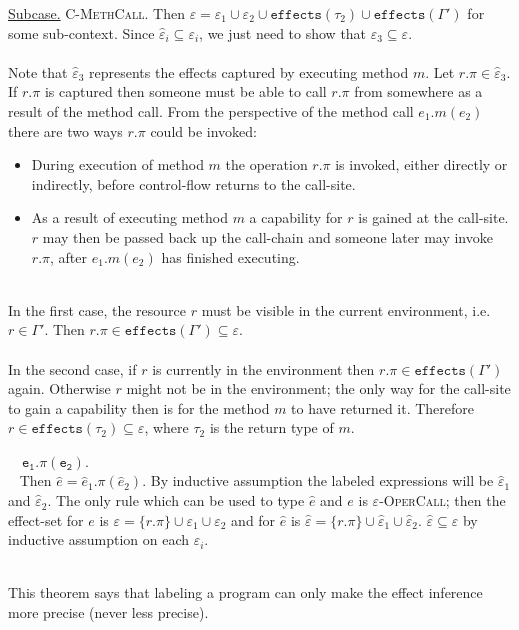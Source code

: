 \documentclass{llncs}
\newcommand{\keywadj}[1]{\mathtt{#1}}
\newcommand{\proofcase}[2]{
	\begin{adjustwidth}{1.5em}{0pt}
		\fbox{Case.}~~#1. \\ ~#2
	\end{adjustwidth}
}
\newcommand{\subcase}[1] {
	\begin{adjustwidth}{2.2em}{0pt}
		\underline{Subcase.} #1
	\end{adjustwidth}
}
\begin{document}
{{	\subcase{\textsc{C-MethCall}. Then $\varepsilon = \varepsilon_1 \cup \varepsilon_2 \cup \keywadj{effects}(\tau_2) \cup \keywadj{effects}(\Gamma')$ for some sub-context. Since $\hat \varepsilon_i \subseteq \varepsilon_i$, we just need to show that $\hat \varepsilon_3 \subseteq \varepsilon$. \\\\ Note that $\hat \varepsilon_3$ represents the effects captured by executing method $m$. Let $r.\pi \in \hat \varepsilon_3$. If $r.\pi$ is captured then someone must be able to call $r.\pi$ from somewhere as a result of the method call. From the perspective of the method call $e_1.m(e_2)$ there are two ways $r.\pi$ could be invoked:
\begin{itemize}
	\item During execution of method $m$ the operation $r.\pi$ is invoked, either directly or indirectly, before control-flow returns to the call-site.
	\item As a result of executing method $m$ a capability for $r$ is gained at the call-site. $r$ may then be passed back up the call-chain and someone later may invoke $r.\pi$, after $e_1.m(e_2)$ has finished executing.
\end{itemize}	
	
~\\In the first case, the resource $r$ must be visible in the current environment, i.e. $r \in \Gamma'$. Then $r.\pi \in \keywadj{effects}(\Gamma') \subseteq \varepsilon$.
	\\\\
	In the second case, if $r$ is currently in the environment then $r.\pi \in \keywadj{effects}(\Gamma')$ again. Otherwise $r$ might not be in the environment; the only way for the call-site to gain a capability then is for the method $m$ to have returned it. Therefore $r \in \keywadj{effects}(\tau_2) \subseteq \varepsilon$, where $\tau_2$ is the return type of $m$.
}
\proofcase{$\keywadj{e_1.\pi(e_2)}$}{
	Then $\hat e = \hat e_1.\pi(\hat e_2)$. By inductive assumption the labeled expressions will be $\hat \varepsilon_1$ and $\hat \varepsilon_2$. The only rule which can be used to type $\hat e$ and $e$ is \textsc{$\varepsilon$-OperCall}; then the effect-set for $e$ is $\varepsilon = \{ r.\pi \} \cup \varepsilon_1 \cup \varepsilon_2$ and for $\hat e$ is $\hat \varepsilon = \{ r.\pi \} \cup \hat \varepsilon_1 \cup \hat \varepsilon_2$. $\hat \varepsilon \subseteq \varepsilon$ by inductive assumption on each $\varepsilon_i$.
}
}
}

\noindent
\\ This theorem says that labeling a program can only make the effect inference more precise (never less precise).\\
\end{document}
